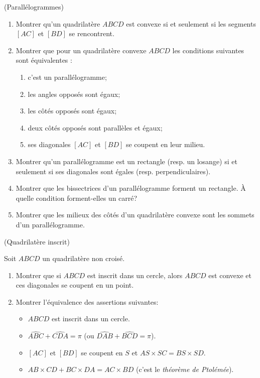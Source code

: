 \documentclass[a4paper,11pt,reqno]{amsart}
\begin{document}
\begin{exo} (Parallélogrammes) %

  \begin{enumerate}
    \item Montrer qu'un quadrilatère $ABCD$ est convexe si et seulement si les segments $[AC]$ et $[BD]$ se rencontrent.
    \item Montrer que pour un quadrilatère convexe $ABCD$ les conditions suivantes sont équivalentes :
    \begin{enumerate}
      \item c'est un parallélogramme;
      \item les angles opposés sont égaux;
      \item les côtés opposés sont égaux;
      \item deux côtés opposés sont parallèles et égaux;
      \item ses diagonales $[AC]$ et $[BD]$ se coupent en leur milieu.
    \end{enumerate}
    \item Montrer qu'un parallélogramme est un rectangle (resp. un losange) si et seulement si ses diagonales sont égales (resp. perpendiculaires).
    \item Montrer que les bissectrices d'un parallélogramme forment un rectangle. À quelle condition forment-elles un carré?
    \item Montrer que les milieux des côtés d'un quadrilatère convexe sont les sommets d'un parallélogramme.
  \end{enumerate}
\end{exo}

\begin{exo} (Quadrilatère inscrit)

    Soit $ABCD$ un quadrilatère non croisé.
    \begin{enumerate}
      \item Montrer que si $ABCD$ est inscrit dans un cercle, alors $ABCD$ est convexe et ces diagonales se coupent en un point.
      \item Montrer l'équivalence des assertions suivantes:
      \begin{itemize}
        \item $ABCD$ est inscrit dans un cercle.
        \item $\widehat{ABC}+\widehat{CDA} = \pi$ (ou $\widehat{DAB}+\widehat{BCD} = \pi$).
        \item $[AC]$ et $[BD]$ se coupent en $S$ et $AS \times SC = BS \times SD$.
        \item $AB\times CD + BC\times DA = AC\times BD$ (c'est le \emph{théorème de Ptolémée}).
      \end{itemize}
    \end{enumerate}
\end{exo}
\end{document}
